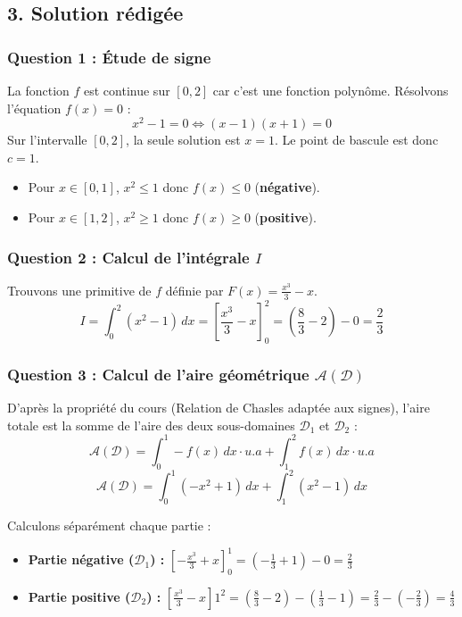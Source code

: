 \documentclass[12pt,a4paper]{article}
\begin{document}
\subsection*{3. Solution rédigée}

\subsubsection*{Question 1 : Étude de signe}
La fonction $f$ est continue sur $[0, 2]$ car c'est une fonction polynôme. 
Résolvons l'équation $f(x) = 0$ :
\[ x^2 - 1 = 0 \iff (x-1)(x+1) = 0 \]
Sur l'intervalle $[0, 2]$, la seule solution est $x = 1$. Le point de bascule est donc \textbf{$c = 1$}.
\begin{itemize}
    \item Pour $x \in [0, 1]$, $x^2 \le 1$ donc $f(x) \le 0$ (\textbf{négative}).
    \item Pour $x \in [1, 2]$, $x^2 \ge 1$ donc $f(x) \ge 0$ (\textbf{positive}).
\end{itemize}

\subsubsection*{Question 2 : Calcul de l'intégrale $I$}
Trouvons une primitive de $f$ définie par $F(x) = \frac{x^3}{3} - x$.
\[ I = \int_{0}^{2} (x^2 - 1) \, dx = \left[ \frac{x^3}{3} - x \right]_{0}^{2} = \left( \frac{8}{3} - 2 \right) - 0 = \frac{2}{3} \]

\subsubsection*{Question 3 : Calcul de l'aire géométrique $\mathcal{A}(\mathcal{D})$}
D'après la propriété du cours (Relation de Chasles adaptée aux signes), l'aire totale est la somme de l'aire des deux sous-domaines $\mathcal{D}_1$ et $\mathcal{D}_2$ :
\[ \mathcal{A}(\mathcal{D}) = \int_{0}^{1} -f(x) \, dx \cdot u.a + \int_{1}^{2} f(x) \, dx \cdot u.a \]
\[ \mathcal{A}(\mathcal{D}) = \int_{0}^{1} (-x^2 + 1) \, dx + \int_{1}^{2} (x^2 - 1) \, dx \]

Calculons séparément chaque partie :
\begin{itemize}
    \item \textbf{Partie négative ($\mathcal{D}_1$) :} $\displaystyle \left[ -\frac{x^3}{3} + x \right]_{0}^{1} = \left(-\frac{1}{3} + 1\right) - 0 = \frac{2}{3}$
    \item \textbf{Partie positive ($\mathcal{D}_2$) :} $\displaystyle \left[ \frac{x^3}{3} - x \right]{1}^{2} = \left(\frac{8}{3} - 2\right) - \left(\frac{1}{3} - 1\right) = \frac{2}{3} - \left(-\frac{2}{3}\right) = \frac{4}{3}$
\end{itemize}
\end{document}
